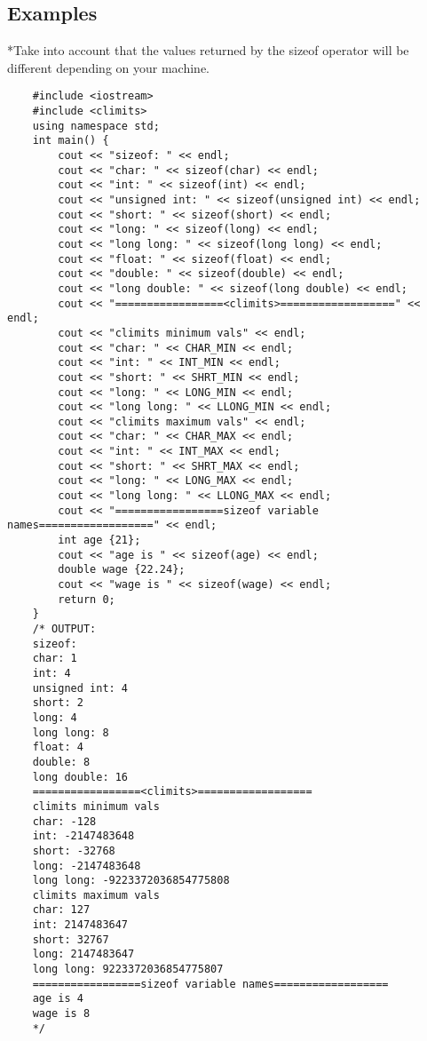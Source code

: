 \subsection{Examples}
*Take into account that the values returned by the sizeof operator will be different depending on your machine.
\begin{verbatim}
    #include <iostream>
    #include <climits>
    using namespace std;
    int main() {
        cout << "sizeof: " << endl;
        cout << "char: " << sizeof(char) << endl;
        cout << "int: " << sizeof(int) << endl;
        cout << "unsigned int: " << sizeof(unsigned int) << endl;
        cout << "short: " << sizeof(short) << endl;
        cout << "long: " << sizeof(long) << endl;
        cout << "long long: " << sizeof(long long) << endl;
        cout << "float: " << sizeof(float) << endl;
        cout << "double: " << sizeof(double) << endl;
        cout << "long double: " << sizeof(long double) << endl;
        cout << "=================<climits>==================" << endl;
        cout << "climits minimum vals" << endl;
        cout << "char: " << CHAR_MIN << endl;
        cout << "int: " << INT_MIN << endl;
        cout << "short: " << SHRT_MIN << endl;
        cout << "long: " << LONG_MIN << endl;
        cout << "long long: " << LLONG_MIN << endl;
        cout << "climits maximum vals" << endl;
        cout << "char: " << CHAR_MAX << endl;
        cout << "int: " << INT_MAX << endl;
        cout << "short: " << SHRT_MAX << endl;
        cout << "long: " << LONG_MAX << endl;
        cout << "long long: " << LLONG_MAX << endl;
        cout << "=================sizeof variable names==================" << endl;
        int age {21};
        cout << "age is " << sizeof(age) << endl;
        double wage {22.24};
        cout << "wage is " << sizeof(wage) << endl;
        return 0;
    }
    /* OUTPUT: 
    sizeof: 
    char: 1 
    int: 4
    unsigned int: 4
    short: 2
    long: 4
    long long: 8
    float: 4
    double: 8
    long double: 16
    =================<climits>==================
    climits minimum vals
    char: -128
    int: -2147483648
    short: -32768
    long: -2147483648
    long long: -9223372036854775808
    climits maximum vals
    char: 127
    int: 2147483647
    short: 32767
    long: 2147483647
    long long: 9223372036854775807
    =================sizeof variable names==================
    age is 4
    wage is 8
    */
\end{verbatim}


